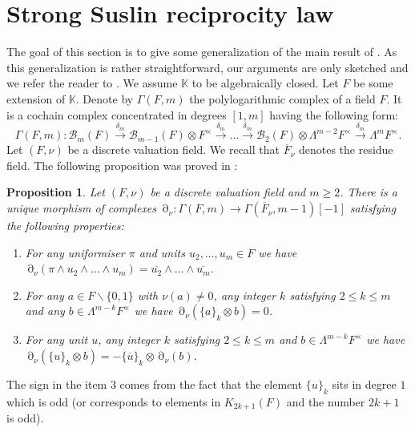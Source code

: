 \documentclass[12pt]{extarticle}
\newtheorem{proposition}[theorem]{Proposition}
\def\mb{\mathbb}
\def\k{\mb K}
\def\t{\times}
\def\ol{\overline}
\def\bs{\backslash}
\DeclareMathOperator{\ts}{\partial}
\begin{document}
\section{Strong Suslin reciprocity law}
\label{sec:strong_suslin_reciprocity_law}
The goal of this section is to give some generalization of the main result of \cite{bolbachan_2023_chow}. As this generalization is rather straightforward, our arguments are only sketched and we refer the reader to \cite{bolbachan_2023_chow}.
We assume $\k$ to be algebraically closed. Let $F$ be some extension of $\k$. Denote by $\Gamma(F,m)$ the polylogarithmic complex of a field $F$. It is a cochain complex concentrated in degrees $[1,m]$ having the following form: 
$$\Gamma(F,m)\colon \mathcal B_m(F)\xrightarrow{\delta_m} \mathcal B_{m-1}(F)\otimes F^\times\xrightarrow{\delta_m}\dots\xrightarrow{\delta_m}\mathcal B_2(F)\otimes \Lambda^{m-2}F^\times\xrightarrow{\delta_m}\Lambda^m F^\times.$$
Let $(F,\nu)$ be a discrete valuation field. We recall that $\ol F_\nu$ denotes the residue field. The following proposition was proved in \cite{goncharov1995geometry}:

\begin{proposition}
\label{prop:tame_symbol}
Let $(F,\nu)$ be a discrete valuation field and $m\geq 2$. There is a unique morphism of complexes $\ts_\nu\colon \Gamma(F,m)\to \Gamma(\ol F_\nu, m-1)[-1]$ satisfying the following properties:

\begin{enumerate}
   \item For any uniformiser $\pi$ and units $u_2,\dots, u_m\in F$ we have $\ts_\nu(\pi\wedge u_2\wedge\dots \wedge u_m)=\overline {u_2}\wedge \dots \wedge \overline{u_m}$.
    \item For any $a\in F\bs \{0,1\}$ with $\nu(a)\ne 0$, any integer $k$ satisfying $2\leq k\leq m$ and any $b\in \Lambda^{m-k}F^\t$ we have $\ts_\nu(\{a\}_k\otimes b)=0$.
    \item For any unit $u$, any integer $k$ satisfying $2\leq k\leq m$ and $b\in \Lambda^{m-k}F^\t$ we have $\ts_\nu(\{u\}_k\otimes b)=-\{\overline u\}_k\otimes \ts_\nu(b)$.
\end{enumerate}
\end{proposition}
The sign in the item $3$ comes from the fact that the element $\{u\}_k$ sits in degree $1$ which is odd (or corresponds to elements in $K_{2k+1}(F)$ and the number $2k+1$ is odd).
\end{document}
